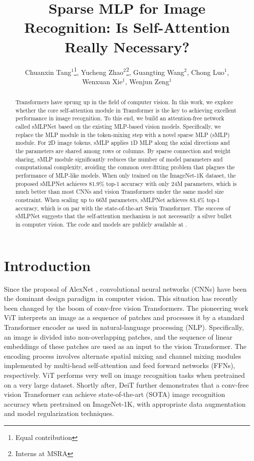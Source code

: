 \documentclass[letterpaper]{article} \usepackage{aaai22}  \usepackage{times}  \usepackage{helvet}  \usepackage{courier}  \usepackage[hyphens]{url}  \usepackage{graphicx} \usepackage{color}
\title{Sparse MLP for Image Recognition: Is Self-Attention Really Necessary?}
\author{


    Chuanxin Tang$^{1}$\thanks{Equal contribution},
    Yucheng Zhao$^{2}$\footnotemark[1]\thanks{Interns at MSRA},
    Guangting Wang$^{2}$\footnotemark[1]\footnotemark[2],
    Chong Luo$^{1}$, \\
    Wenxuan Xie$^{1}$,
    Wenjun Zeng$^{1}$
}
\begin{document}
\maketitle


\begin{abstract}
Transformers have sprung up in the field of computer vision. In this work, we explore whether the core self-attention module in Transformer is the key to achieving excellent performance in image recognition. To this end, we build an attention-free network called sMLPNet based on the existing MLP-based vision models. Specifically, we replace the MLP module in the token-mixing step with a novel sparse MLP (sMLP) module. For 2D image tokens, sMLP applies 1D MLP along the axial directions and the parameters are shared among rows or columns. By sparse connection and weight sharing, sMLP module significantly reduces the number of model parameters and computational complexity, avoiding the common over-fitting problem that plagues the performance of MLP-like models. When only trained on the ImageNet-1K dataset, the proposed sMLPNet achieves 81.9\% top-1 accuracy with only 24M parameters, which is much better than most CNNs and vision Transformers under the same model size constraint. When scaling up to 66M parameters, sMLPNet achieves 83.4\% top-1 accuracy, which is on par with the state-of-the-art Swin Transformer. The success of sMLPNet suggests that the self-attention mechanism is not necessarily a
silver bullet in computer vision. The code and models are publicly available at {\footnotesize{}}.
\end{abstract}







\section{Introduction}
Since the proposal of AlexNet \cite{krizhevsky2012imagenet}, convolutional neural networks (CNNs) have been the dominant design paradigm in computer vision. This situation has recently been changed by the boom of conv-free vision Transformers. The pioneering work ViT \cite{dosovitskiy2020image} interprets an image as a sequence of patches and processes it by a standard Transformer encoder as used in natural-language processing (NLP). Specifically, an image is divided into non-overlapping patches, and the sequence of linear embeddings of these patches are used as an input to the vision Transformer. The encoding process involves alternate spatial mixing and channel mixing modules implemented by multi-head self-attention and feed forward networks (FFNs), respectively. ViT performs very well on image recognition tasks when pretrained on a very large dataset. Shortly after, DeiT \cite{touvron2021training} further demonstrates that a conv-free vision Transformer can achieve state-of-the-art (SOTA) image recognition accuracy when pretrained on ImageNet-1K, with appropriate data augmentation and model regularization techniques.
\end{document}
